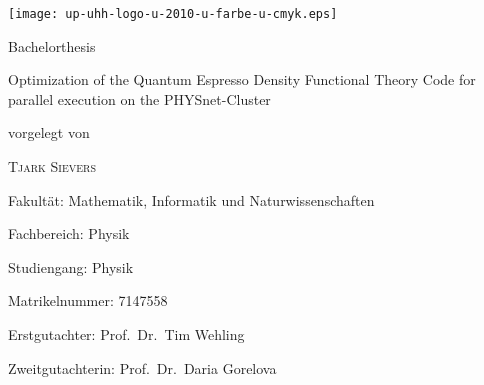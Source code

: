 \documentclass[main.tex]{subfiles}
\begin{document}
\begin{titlepage}
    \texttt{[image: up-uhh-logo-u-2010-u-farbe-u-cmyk.eps]}\par
    \vspace{4\baselineskip}

    \begin{center}
        {\Large\textcolor{UHHred}{Bachelorthesis}\par}

        {\Huge Optimization of the Quantum Espresso Density Functional Theory Code for parallel execution on the PHYSnet-Cluster\par}

        \vspace{4\baselineskip}

        vorgelegt von\par

        {\Large\textsc{Tjark Sievers}\par}
    \end{center}

    \vfill

    Fakultät: Mathematik, Informatik und Naturwissenschaften\par
    Fachbereich: Physik\par
    Studiengang: Physik\par
    Matrikelnummer: 7147558\par
 
    Erstgutachter: Prof.\, Dr.\, Tim Wehling \par
    Zweitgutachterin: Prof.\, Dr.\, Daria Gorelova \par
\end{titlepage}
\end{document}

